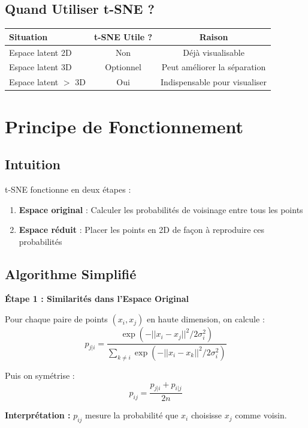 \documentclass[a4paper,11pt]{article}
\begin{document}
\subsection{Quand Utiliser t-SNE ?}

\begin{center}
\begin{tabular}{|l|c|c|}
\hline
\textbf{Situation} & \textbf{t-SNE Utile ?} & \textbf{Raison} \\
\hline
Espace latent 2D & Non & Déjà visualisable \\
Espace latent 3D & Optionnel & Peut améliorer la séparation \\
Espace latent $>$ 3D & Oui & Indispensable pour visualiser \\
\hline
\end{tabular}
\end{center}

\section{Principe de Fonctionnement}

\subsection{Intuition}

t-SNE fonctionne en deux étapes :
\begin{enumerate}
    \item \textbf{Espace original} : Calculer les probabilités de voisinage entre tous les points
    \item \textbf{Espace réduit} : Placer les points en 2D de façon à reproduire ces probabilités
\end{enumerate}

\subsection{Algorithme Simplifié}

\begin{mathbox}
\textbf{Étape 1 : Similarités dans l'Espace Original}

Pour chaque paire de points $(x_i, x_j)$ en haute dimension, on calcule :
$$ p_{j|i} = \frac{\exp(-||x_i - x_j||^2 / 2\sigma_i^2)}{\sum_{k \neq i} \exp(-||x_i - x_k||^2 / 2\sigma_i^2)} $$

Puis on symétrise :
$$ p_{ij} = \frac{p_{j|i} + p_{i|j}}{2n} $$

\textbf{Interprétation :} $p_{ij}$ mesure la probabilité que $x_i$ choisisse $x_j$ comme voisin.
\end{mathbox}
\end{document}
